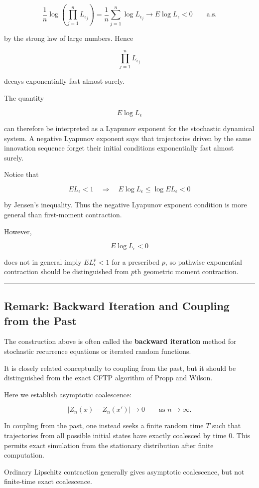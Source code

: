 \[\frac1n
\log\left(
\prod_{j=1}^nL_{\epsilon_j}
\right)
=
\frac1n\sum_{j=1}^n\log L_{\epsilon_j}
\longrightarrow
E\log L_\epsilon<0
\qquad\text{a.s.}\]

by the strong law of large numbers. Hence

\[\prod_{j=1}^nL_{\epsilon_j}\]

decays exponentially fast almost surely.

The quantity

\[E\log L_\epsilon\]

can therefore be interpreted as a Lyapunov exponent for the stochastic dynamical system. A negative Lyapunov exponent says that trajectories driven by the same innovation sequence forget their initial conditions exponentially fast almost surely.

Notice that

\[EL_\epsilon<1
\quad\Longrightarrow\quad
E\log L_\epsilon
\le
\log EL_\epsilon<0\]

by Jensen's inequality. Thus the negative Lyapunov exponent condition is more general than first-moment contraction.

However,

\[E\log L_\epsilon<0\]

does not in general imply \(EL_\epsilon^p<1\) for a prescribed \(p\), so pathwise exponential contraction should be distinguished from \(p\)th geometric moment contraction.

\begin{center}\rule{0.5\linewidth}{0.5pt}\end{center}

\subsection*{Remark: Backward Iteration and Coupling from the Past}
The construction above is often called the \textbf{backward iteration} method for stochastic recurrence equations or iterated random functions.

It is closely related conceptually to coupling from the past, but it should be distinguished from the exact CFTP algorithm of Propp and Wilson.

Here we establish asymptotic coalescence:

\[|Z_n(x)-Z_n(x')|\to0
\qquad\text{as }n\to\infty.\]

In coupling from the past, one instead seeks a finite random time \(T\) such that trajectories from all possible initial states have exactly coalesced by time \(0\). This permits exact simulation from the stationary distribution after finite computation.

Ordinary Lipschitz contraction generally gives asymptotic coalescence, but not finite-time exact coalescence.
